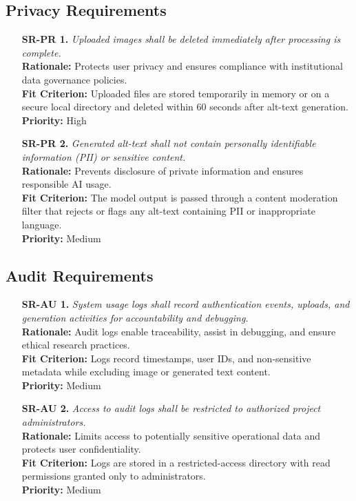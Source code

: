 \documentclass[12pt]{article}
\begin{document}
\subsection{Privacy Requirements}
\begin{itemize}
  \item[\textbf{SR-PR 1.}] \textit{Uploaded images shall be deleted
    immediately after processing is complete.}\\
    \textbf{Rationale:} Protects user privacy and ensures compliance
    with institutional data governance policies.\\
    \textbf{Fit Criterion:} Uploaded files are stored temporarily in
    memory or on a secure local directory and deleted within 60
    seconds after alt-text generation.\\
    \textbf{Priority:} High

  \item[\textbf{SR-PR 2.}] \textit{Generated alt-text shall not
    contain personally identifiable information (PII) or sensitive content.}\\
    \textbf{Rationale:} Prevents disclosure of private information
    and ensures responsible AI usage.\\
    \textbf{Fit Criterion:} The model output is passed through a
    content moderation filter that rejects or flags any alt-text
    containing PII or inappropriate language.\\
    \textbf{Priority:} Medium
\end{itemize}

\subsection{Audit Requirements}
\begin{itemize}
  \item[\textbf{SR-AU 1.}] \textit{System usage logs shall record
      authentication events, uploads, and generation activities for
    accountability and debugging.}\\
    \textbf{Rationale:} Audit logs enable traceability, assist in
    debugging, and ensure ethical research practices.\\
    \textbf{Fit Criterion:} Logs record timestamps, user IDs, and
    non-sensitive metadata while excluding image or generated text content.\\
    \textbf{Priority:} Medium

  \item[\textbf{SR-AU 2.}] \textit{Access to audit logs shall be
    restricted to authorized project administrators.}\\
    \textbf{Rationale:} Limits access to potentially sensitive
    operational data and protects user confidentiality.\\
    \textbf{Fit Criterion:} Logs are stored in a restricted-access
    directory with read permissions granted only to administrators.\\
    \textbf{Priority:} Medium
\end{itemize}
\end{document}
